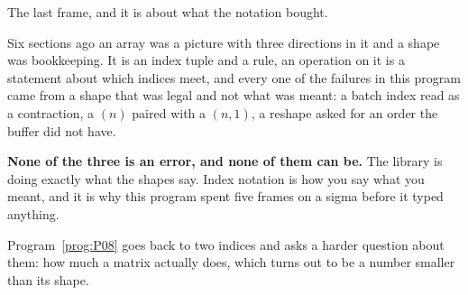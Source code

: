 \begin{fr}
The last frame, and it is about what the notation bought.

Six sections ago an array was a picture with three directions in it and a shape
was bookkeeping. It is an index tuple and a rule, an operation on it is a
statement about which indices meet, and every one of the failures in this
program came from a shape that was legal and not what was meant: a batch index
read as a contraction, a $(n)$ paired with a $(n, 1)$, a reshape asked for an
order the buffer did not have.

\textbf{None of the three is an error, and none of them can be.} The library is
doing exactly what the shapes say. Index notation is how you say what you
meant, and it is why this program spent five frames on a sigma before it typed
anything.

Program~\ref{prog:P08} goes back to two indices and asks a harder question
about them: how much a matrix actually does, which turns out to be a number
smaller than its shape.
\end{fr}

